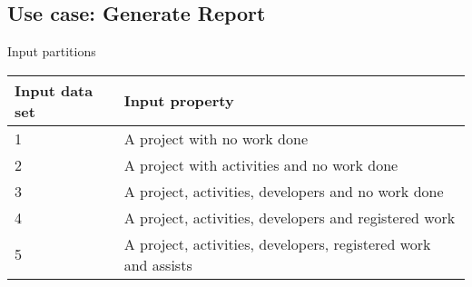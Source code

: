 \subsection{Use case: Generate Report}


Input partitions
\begin{center}
  \begin{tabular}{| l | l |}
    \hline
	Input data set & Input property \\ \hline
    1 & A project with no work done \\ \hline
    2 & A project with activities and no work done \\ \hline
    3 & A project, activities, developers and no work done \\ \hline
	4 & A project, activities, developers and registered work \\ \hline
	5 & A project, activities, developers, registered work and assists \\
    \hline
  \end{tabular}
\end{center}


